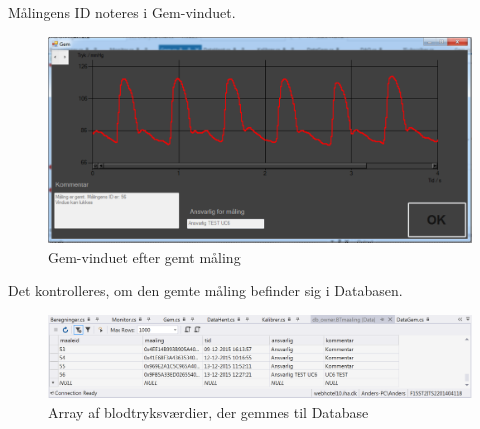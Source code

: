 Målingens ID noteres i Gem-vinduet.

\begin{figure}[H]
	\centering
	\includegraphics[width=1\textwidth]{Figurer/UC6_MalSuc}
	\caption{Gem-vinduet efter gemt måling}
\end{figure}


Det kontrolleres, om den gemte måling befinder sig i Databasen. 

\begin{figure}[H]
	\centering
	\includegraphics[width=1\textwidth]{Figurer/UC6_Database2}
	\caption{Array af blodtryksværdier, der gemmes til Database}
\end{figure}





